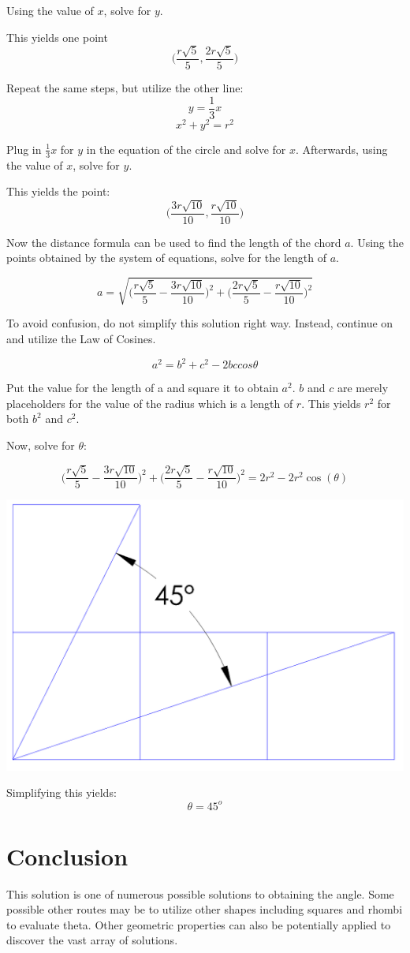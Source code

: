 \documentclass{article}
\begin{document}
Using the value of $x$, solve for $y$. 

This yields one point $$\bigg(\frac{ r\sqrt{5} }{5}, \frac{ 2r\sqrt{5} }{5}\bigg)$$

Repeat the same steps, but utilize the other line:
$$ y=\frac{1}{3}x $$
$$ x^2+y^2=r^2 $$

Plug in $\frac{1}{3}x$ for $y$ in the equation of the circle and solve for $x$. Afterwards, using the value of $x$, solve for $y$. 


This yields the point: $$\bigg(\frac{3r\sqrt{10}}{10}, \frac{r\sqrt{10}}{10}\bigg)$$

Now the distance formula can be used to find the length of the chord $a$. Using the points obtained by the system of equations, solve for the length of $a$. 

$$ a=\sqrt{\bigg(\frac{ r\sqrt{5} }{5}-\frac{3r\sqrt{10}}{10}\bigg)^2 + \bigg(\frac{ 2r\sqrt{5} }{5}-\frac{r\sqrt{10}}{10}\bigg)^2}$$


To avoid confusion, do not simplify this solution right way. Instead, continue on and utilize the Law of Cosines.

$$ a^2=b^2+c^2-2bccos\theta$$

Put the value for the length of a and square it to obtain $a^2$. $b$ and $c$ are merely placeholders for the value of the radius which is a length of $r$. This yields $r^2$ for both $b^2$ and $c^2$. 

Now, solve for $\theta$:

$$\bigg(\frac{ r\sqrt{5} }{5}-\frac{3r\sqrt{10}}{10}\bigg)^2 + \bigg(\frac{ 2r\sqrt{5} }{5}-\frac{r\sqrt{10}}{10}\bigg)^2 = 2r^2-2r^2\cos(\theta)$$

 \begin{center}

\includegraphics[width=.8\linewidth]{solution.png}
 \end{center}
Simplifying this yields:
$$\theta=45^o$$
\pagebreak
\section*{Conclusion}

This solution is one of numerous possible solutions to obtaining the angle. Some possible other routes may be to utilize other shapes including squares and rhombi to evaluate theta. Other geometric properties can also be potentially applied to discover the vast array of solutions. 
\end{document}
